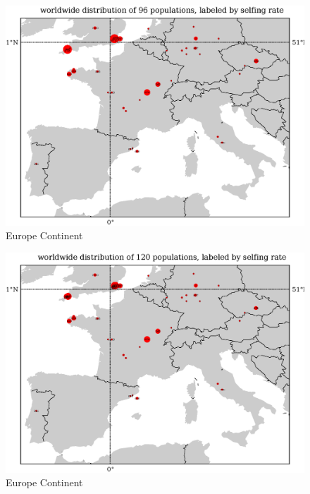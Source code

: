 \documentclass[a4paper,10pt]{article}
\begin{document}
\begin{figure}
\includegraphics[width=1\textwidth]{figures/s0829popid2ecotypeid_10_EurCont__10_35_20_53_l3y1_pop_map.eps}
\caption{Europe Continent}\label{f14}
\end{figure}

\begin{figure}
\includegraphics[width=1\textwidth]{figures/s0829popid2ecotypeid_5_EurCont__10_35_20_53_l3y1_pop_map.eps}
\caption{Europe Continent}\label{f13}
\end{figure}
\end{document}
